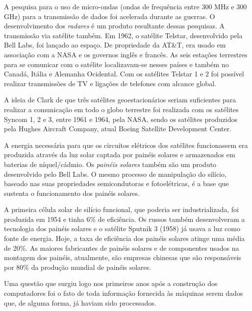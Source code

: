 \documentclass{hipatia}
\begin{document}
A pesquisa para o uso de micro-ondas (ondas de frequência entre 300 MHz e 300 GHz) para a transmissão de dados foi acelerada durante as guerras. O desenvolvimento dos \textit{radares} é um produto resultante dessas pesquisas. A transmissão via satélite também. Em 1962, o satélite Telstar, desenvolvido pela Bell Labs, foi lançado ao espaço. De propriedade da AT\&T, era usado em associação com a NASA e os governos inglês e francês. As seis estações terrestres para se comunicar com o satélite localizavam-se nesses países e também no Canadá, Itália e Alemanha Ocidental. Com os satélites Telstar 1 e 2 foi possível realizar transmissões de TV e ligações de telefones com alcance global. 

A ideia de Clark de que três satélites geoestacionários seriam suficientes para realizar a comunicação em todo o globo terrestre foi realizada com os satélites Syncom 1, 2 e 3, entre 1961 e 1964, pela NASA, sendo os satélites produzidos pela Hughes Aircraft Company, atual Boeing Satellite Development Center.

A energia necessária para que os circuitos elétricos dos satélites funcionassem era produzida através da luz solar captada por painéis solares e armazenados em baterias de níquel/cádmio. Os \textit{painéis solares} também são um produto desenvolvido pelo Bell Labs. O mesmo processo de manipulação do silício, baseado nas suas propriedades semicondutoras e fotoelétricas, é a base que sustenta o funcionamento dos painéis solares.

A primeira célula solar de silício funcional, que poderia ser industrializada, foi produzida em 1954 e tinha 6\% de eficiência. Os russos também desenvolveram a tecnologia dos painéis solares e o satélite Sputnik 3 (1958) já usava a luz como fonte de energia. Hoje, a taxa de eficiência dos painéis solares atinge uma média de 20\%. As maiores fabricantes de painéis solares e de componentes usados na montagem dos painéis, atualmente, são empresas chinesas que são responsáveis por 80\% da produção mundial de painéis solares.

Uma questão que surgiu logo nos primeiros anos após a construção dos computadores foi o fato de toda informação fornecida às máquinas serem dados que, de alguma forma, já haviam sido processados.
\end{document}
